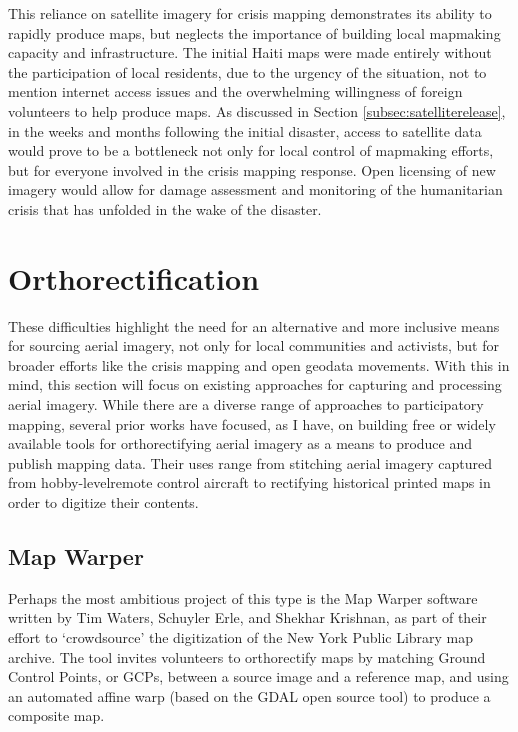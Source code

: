 \documentclass[11pt,oneside,notitlepage]{report}
\begin{document}
{{This reliance on satellite imagery for crisis mapping demonstrates its ability to rapidly produce maps, but neglects the importance of building local mapmaking capacity and infrastructure. The initial Haiti maps were made entirely without the participation of local residents, due to the urgency of the situation, not to mention internet access issues and the overwhelming willingness of foreign volunteers to help produce maps. As discussed in Section \ref{subsec:satelliterelease}, in the weeks and months following the initial disaster, access to satellite data would prove to be a bottleneck not only for local control of mapmaking efforts, but for everyone involved in the crisis mapping response. Open licensing of new imagery would allow for damage assessment and monitoring of the humanitarian crisis that has unfolded in the wake of the disaster.

\section{Orthorectification}
\label{sec:existingtechniques}

These difficulties highlight the need for an alternative and more inclusive means for sourcing aerial imagery, not only for local communities and activists, but for broader efforts like the crisis mapping and open geodata movements. With this in mind, this section will focus on existing approaches for capturing and processing aerial imagery. While there are a diverse range of approaches to participatory mapping, several prior works have focused, as I have, on building free or widely available tools for orthorectifying aerial imagery as a means to produce and publish mapping data. Their uses range from stitching aerial imagery captured from hobby-levelremote control aircraft to rectifying historical printed maps in order to digitize their contents.

\subsection{Map Warper}
\label{subsec:mapwarper}

Perhaps the most ambitious project of this type is the Map Warper software written by Tim Waters, Schuyler Erle, and Shekhar Krishnan, as part of their effort to `crowdsource' the digitization of the New York Public Library map archive. \cite{waters2009warper} The tool invites volunteers to orthorectify maps by matching Ground Control Points, or GCPs, between a source image and a reference map, and using an automated affine warp (based on the \ac{GDAL} open source tool) to produce a composite map. 

}}
\end{document}
